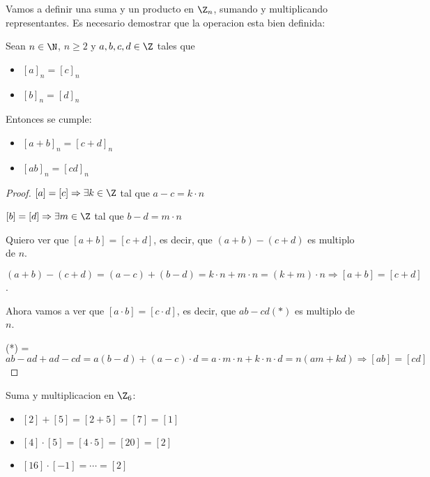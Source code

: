 Vamos a definir una suma y un producto en \(\Z_n \), sumando y multiplicando representantes. Es necesario demostrar que la operacion esta bien definida:
\begin{proposition}
	Sean \(n \in \N \), \(n \geq  2 \) y \(a,b,c,d \in \Z \) tales que
	\begin{itemize}
		\item \([a]_n = [c]_n \)
		\item \([b]_n = [d]_n \)

	\end{itemize}
	Entonces se cumple:
	\begin{itemize}
		\item \([a+b]_n = [c+d]_n \)
		\item \([ab]_n = [cd]_n \)
	\end{itemize}
\end{proposition}
\begin{proof}
	\([a] = [c] \Rightarrow \exists k \in \Z \) tal que \(a - c = k \cdot n \)

	\([b] = [d] \Rightarrow \exists m \in \Z \) tal que \(b - d = m \cdot n \)

	Quiero ver que \([a+b ] = [c + d ]\), es decir, que \((a + b) - (c + d) \) es multiplo de \(n \).

	\((a+b) - (c + d) = (a - c) + (b - d) = k \cdot n + m \cdot n = (k + m) \cdot n \Rightarrow [a + b] = [c + d ]\).

	Ahora vamos a ver que \([a \cdot b] = [c \cdot d ]\), es decir, que \(ab - cd (*)\) es multiplo de \(n \).

	(*) =  \(ab - ad + ad - cd = a(b - d) + (a - c) \cdot d = a \cdot m \cdot n + k \cdot n \cdot d = n (am + kd) \Rightarrow [ab] = [cd]\)
\end{proof}
\begin{example}
	Suma y multiplicacion en \(\Z_6\):
	\begin{itemize}
		\item \([2] + [5] = [2 + 5] = [7] = [1]\)
		\item \([4] \cdot [5] = [4 \cdot 5] = [20] = [2 ]\)
		\item \([16] \cdot [-1] = \cdots = [2 ]\)
	\end{itemize}
\end{example}

